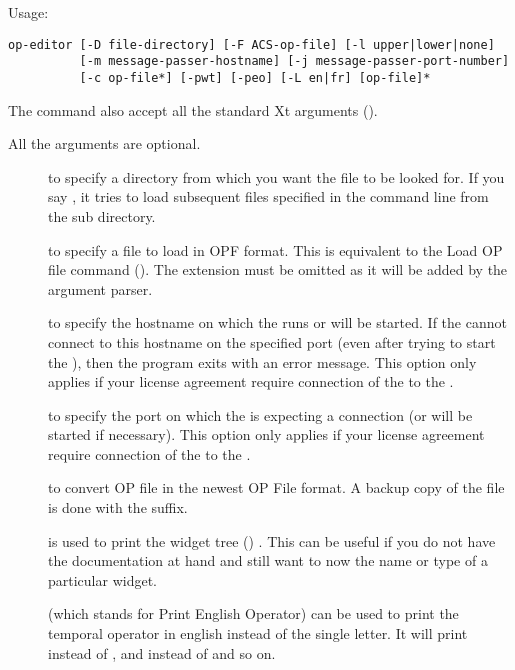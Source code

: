 Usage: \begin{verbatim}
op-editor [-D file-directory] [-F ACS-op-file] [-l upper|lower|none]
          [-m message-passer-hostname] [-j message-passer-port-number]
          [-c op-file*] [-pwt] [-peo] [-L en|fr] [op-file]*
\end{verbatim}

The  command also accept all the standard Xt arguments
(). 

All the arguments are optional.

\begin{description}

\item[] to specify a directory from which you want the file to
be looked for. If you say , it tries to load
subsequent files specified in the command line from the 
sub directory.

\item[] to specify a file to load in OPF format. This is
equivalent to the Load OP file command (). The
 extension must be omitted as it will be added by the
argument parser.

\item[] to specify the hostname on which the \MP{} runs or will be
started. If the \OPE{} cannot connect to this hostname on the specified port
(even after trying to start the \MP{}), then the program exits with an error
message. This option only applies if your license agreement require connection
of the \OPE{} to the \MP{}.

\item[] to specify the port on which the \MP{} is expecting a
connection (or will be started if necessary). This option only applies if your
license agreement require connection of the \OPE{} to the \MP{}.

\item[] to convert OP file in the newest OP File format. A backup copy
of the file is done with the  suffix.

\item[] is used to print the \OPE{} widget tree () . This can be useful if you do not have the
documentation at hand and still want to now the name or type of a particular
widget.

\item[] (which stands for Print English Operator) can be used to
print the temporal operator in english instead of the single letter. It will
print  instead of \samp{!}, and  instead of \samp{\^{}}
and so on.


\end{description}
